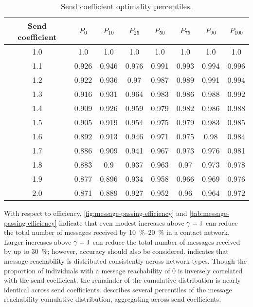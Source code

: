 \begin{table}[tbp]
\centering
\begin{tabular}{
  S
  S[table-auto-round, table-format = 1.3]
  S[table-auto-round, table-format = 1.3]
  S[table-auto-round, table-format = 1.3]
  S[table-auto-round, table-format = 1.3]
  S[table-auto-round, table-format = 1.3]
  S[table-auto-round, table-format = 1.3]
  S[table-auto-round, table-format = 1.3]
}
  \toprule
  {Send coefficient} & {$P_{0}$} & {$P_{10}$} & {$P_{25}$} & {$P_{50}$} & {$P_{75}$} & {$P_{90}$} & {$P_{100}$} \\
   & 1.0 & 1.0 & 1.0 & 1.0 & 1.0 & 1.0 & 1.0 \\ 
  1.1 & 0.926 & 0.946 & 0.976 & 0.991 & 0.993 & 0.994 & 0.996 \\ 
  1.2 & 0.922 & 0.936 & 0.97 & 0.987 & 0.989 & 0.991 & 0.994 \\ 
  1.3 & 0.916 & 0.931 & 0.964 & 0.983 & 0.986 & 0.988 & 0.992 \\ 
  1.4 & 0.909 & 0.926 & 0.959 & 0.979 & 0.982 & 0.986 & 0.988 \\ 
  1.5 & 0.905 & 0.919 & 0.954 & 0.975 & 0.979 & 0.983 & 0.985 \\ 
  1.6 & 0.892 & 0.913 & 0.946 & 0.971 & 0.975 & 0.98 & 0.984 \\ 
  1.7 & 0.886 & 0.909 & 0.941 & 0.967 & 0.973 & 0.976 & 0.981 \\ 
  1.8 & 0.883 & 0.9 & 0.937 & 0.963 & 0.97 & 0.973 & 0.978 \\ 
  1.9 & 0.877 & 0.896 & 0.934 & 0.958 & 0.966 & 0.969 & 0.976 \\ 
  2.0 & 0.871 & 0.889 & 0.927 & 0.952 & 0.96 & 0.964 & 0.972 \\ 
  \bottomrule
\end{tabular}
\caption[Send coefficient optimality percentiles]{Send coefficient optimality percentiles.}
\label{tab:send-coefficient-optimality}
\end{table}

With respect to efficiency, \cref{fig:message-passing-efficiency} and \cref{tab:message-passing-efficiency} indicate that even modest increases above $\gamma = 1$ can reduce the total number of messages received by \qtyrange{10}{20}{\percent} in a contact network. Larger increases above $\gamma = 1$ can reduce the total number of messages received by up to \qty{30}{\percent}; however, accuracy should also be considered.  indicates that message reachability is distributed consistently across network types. Though the proportion of individuals with a message reachability of 0 is inversely correlated with the send coefficient, the remainder of the cumulative distribution is nearly identical across send coefficients.  describes several percentiles of the message reachability cumulative distribution, aggregating across send coefficients.

